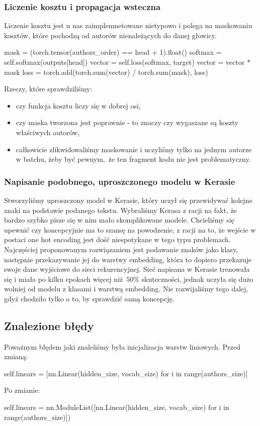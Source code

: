 \subsubsection{Liczenie kosztu i propagacja wsteczna}
Liczenie kosztu jest u nas zaimplemnetowane nietypowo i polega na maskowaniu kosztów, które pochodzą od autorów
nienależących do danej głowicy. 
\begin{python}
mask = (torch.tensor(authors_order) == head + 1).float()
softmax = self.softmax(outputs[head])
vector = self.loss(softmax, target)
vector = vector * mask
loss = torch.add(torch.sum(vector) / torch.sum(mask), loss)
    
\end{python} 
Rzeczy, które sprawdziliśmy: 
\begin{itemize}
	  \item {czy funkcja kosztu liczy się w dobrej osi,}
	  \item {czy maska tworzona jest poprawnie - to znaczy czy wygaszane są koszty właściwych autorów,}
	  \item {całkowicie zlikwidowaliśmy maskowanie i uczyliśmy tylko na jednym autorze w batchu, żeby być pewnym, że ten fragment
	  kodu nie jest problematyczny.}
\end{itemize}

\subsubsection{Napisanie podobnego, uproszczonego modelu w Kerasie}
Stworzyliśmy uproszczony model w Kerasie, który uczył się przewidywać kolejne znaki na podstawie podanego tekstu. 
Wybraliśmy Kerasa z racji na fakt, że bardzo szybko pisze się w nim mało skomplikowane modele.
Chcieliśmy się upewnić czy koncepcyjnie ma to szansę na powodzenie, z racji na to, że wejście w postaci one hot encoding 
jest dość niespotykane w tego typu problemach. Najczęściej proponowanym rozwiązaniem jest podawanie znaków jako klasy, następnie 
przekazywanie jej do warstwy embedding, która to dopiero przekazuje swoje dane wyjściowe do sieci rekurencyjnej. 
Sieć napisana w Kerasie trenowała się i miała po kilku epokach więcej niż $50\%$ skuteczności, jednak uczyła się
dużo wolniej od modelu z klasami i warstwą embedding. Nie rozwijaliśmy tego dalej, gdyż chodziło tylko o to,
by sprawdzić samą koncepcję.

\newpage
\subsection{Znalezione błędy}
Poważnym błędem jaki znaleliśmy była inicjalizacja warstw liniowych.
Przed zmianą:
\begin{python}
self.linears = [nn.Linear(hidden_size, vocab_size) for i in range(authors_size)]

\end{python} 
Po zmianie:
\begin{python}
self.linears = nn.ModuleList([nn.Linear(hidden_size, vocab_size) for i in range(authors_size)])

\end{python} 

